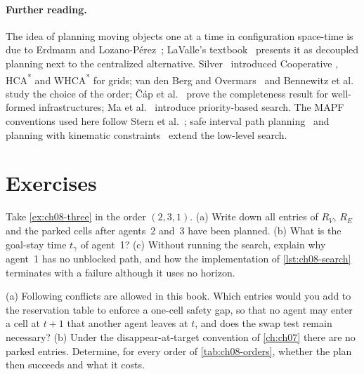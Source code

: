 \paragraph{Further reading.} The idea of planning moving objects one at a time in
configuration space-time is due to Erdmann and Lozano-P\'erez~\cite{erdmann1987multiple};
LaValle's textbook~\cite{lavalle2006planning} presents it as decoupled planning next to
the centralized alternative. Silver~\cite{silver2005cooperative} introduced Cooperative
\astar, HCA\textsuperscript{*} and WHCA\textsuperscript{*} for grids; van den Berg and
Overmars~\cite{vandenberg2005prioritized} and Bennewitz et
al.~\cite{bennewitz2002finding} study the choice of the order; \v{C}\'ap et
al.~\cite{cap2015prioritized} prove the completeness result for well-formed
infrastructures; Ma et al.~\cite{ma2019searching} introduce priority-based search. The
MAPF conventions used here follow Stern et al.~\cite{stern2019mapf}; safe interval path
planning~\cite{phillips2011sipp} and planning with kinematic
constraints~\cite{honig2016mapf} extend the low-level search.

\section{Exercises}
\label{sec:ch08-exercises}

\begin{exercise}
\label{exr:ch08-table}
Take \cref{ex:ch08-three} in the order $(2,3,1)$. (a) Write down all entries of $R_V$,
$R_E$ and the parked cells after agents~2 and~3 have been planned. (b) What is the
goal-stay time $t_\gamma$ of agent~1? (c) Without running the search, explain why agent~1
has no unblocked path, and how the implementation of \cref{lst:ch08-search} terminates
with a failure although it uses no horizon.
\end{exercise}

\begin{exercise}
\label{exr:ch08-following}
(a) Following conflicts are allowed in this book. Which entries would you add to the
reservation table to enforce a one-cell safety gap, so that no agent may enter a cell
at $t + 1$ that another agent leaves at $t$, and does the swap test remain necessary?
(b) Under the disappear-at-target convention of \cref{ch:ch07} there are no parked
entries. Determine, for every order of \cref{tab:ch08-orders}, whether the plan then
succeeds and what it costs.
\end{exercise}

